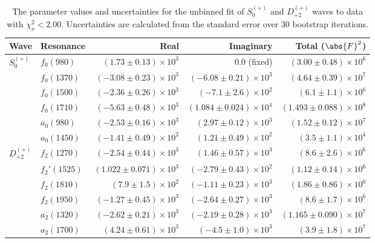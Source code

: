 \begin{table}
    \begin{center}
        \begin{tabular}{llrrr}\toprule
        Wave & Resonance & Real & Imaginary & Total ($\abs{F}^2$) \\\midrule
$S_{0}^{(+)}$ & $f_{0}(980)$ & $(1.73 \pm 0.13) \times 10^{3}$ & $0.0$ (fixed) & $(3.00 \pm 0.48) \times 10^{6}$ \\
 & $f_{0}(1370)$ & $(-3.08 \pm 0.23) \times 10^{3}$ & $(-6.08 \pm 0.21) \times 10^{3}$ & $(4.64 \pm 0.39) \times 10^{7}$ \\
 & $f_{0}(1500)$ & $(-2.36 \pm 0.26) \times 10^{3}$ & $(-7.1 \pm 2.6) \times 10^{2}$ & $(6.1 \pm 1.1) \times 10^{6}$ \\
 & $f_{0}(1710)$ & $(-5.63 \pm 0.48) \times 10^{3}$ & $(1.084 \pm 0.024) \times 10^{4}$ & $(1.493 \pm 0.088) \times 10^{8}$ \\
 & $a_{0}(980)$ & $(-2.53 \pm 0.16) \times 10^{3}$ & $(2.97 \pm 0.12) \times 10^{3}$ & $(1.52 \pm 0.12) \times 10^{7}$ \\
 & $a_{0}(1450)$ & $(-1.41 \pm 0.49) \times 10^{2}$ & $(1.21 \pm 0.49) \times 10^{2}$ & $(3.5 \pm 1.1) \times 10^{4}$ \\
$D_{+2}^{(+)}$ & $f_{2}(1270)$ & $(-2.54 \pm 0.44) \times 10^{3}$ & $(1.46 \pm 0.57) \times 10^{3}$ & $(8.6 \pm 2.6) \times 10^{6}$ \\
 & $f_{2}'(1525)$ & $(1.022 \pm 0.071) \times 10^{3}$ & $(-2.79 \pm 0.43) \times 10^{2}$ & $(1.12 \pm 0.14) \times 10^{6}$ \\
 & $f_{2}(1810)$ & $(7.9 \pm 1.5) \times 10^{2}$ & $(-1.11 \pm 0.23) \times 10^{3}$ & $(1.86 \pm 0.86) \times 10^{6}$ \\
 & $f_{2}(1950)$ & $(-1.27 \pm 0.45) \times 10^{3}$ & $(-2.64 \pm 0.27) \times 10^{3}$ & $(8.6 \pm 1.7) \times 10^{6}$ \\
 & $a_{2}(1320)$ & $(-2.62 \pm 0.21) \times 10^{3}$ & $(-2.19 \pm 0.28) \times 10^{3}$ & $(1.165 \pm 0.090) \times 10^{7}$ \\
 & $a_{2}(1700)$ & $(4.24 \pm 0.61) \times 10^{3}$ & $(-4.5 \pm 1.0) \times 10^{3}$ & $(3.9 \pm 1.8) \times 10^{7}$ \\\bottomrule
        \end{tabular}
    \caption{The parameter values and uncertainties for the unbinned fit of $S_{0}^{(+)}$ and $D_{+2}^{(+)}$ waves to data with $\chi^2_\nu < 2.00$. Uncertainties are calculated from the standard error over $30$ bootstrap iterations.}\label{tab:unbinned-fit-chisqdof-2.0-Sp0p-Dp2p}
    \end{center}
\end{table}
